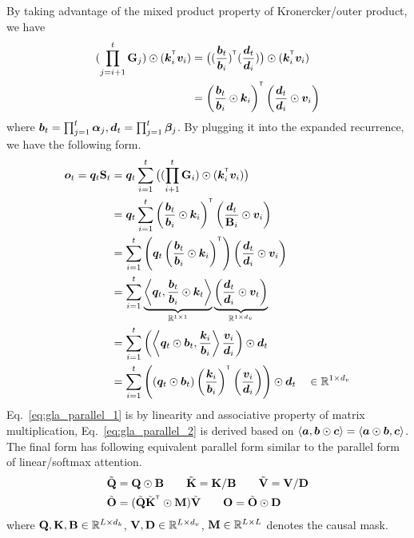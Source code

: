 By taking advantage of the mixed product property of Kronercker/outer product, we have
%
\begin{align}
(\prod_{j=i+1}^{t} \rmG_j) \odot (\vk_i^{\intercal} \vv_i) &= \big((\frac{\vb_t}{\vb_i})^{\intercal}(\frac{\vd_t}{\vd_i})\big) \odot (\vk_i^{\intercal} \vv_i) \\
&=\left( \frac{\vb_t}{\vb_i}\odot \vk_i \right)^{\intercal} \left( \frac{\vd_t}{\vd_i} \odot \vv_i \right) 
\end{align}
%
where ${\bm{b}}_t = \prod_{j=1}^t {\bm{\alpha}}_j, {\bm{d}}_t = \prod_{j=1}^t {\bm{\beta}}_j$.
By plugging it into the expanded recurrence, we have the following form. 
%
\begin{align}
\vo_t = \vq_t \rmS_t 
&= 
\vq_t \sum_{i=1}^{t} \big((\prod_{i+1}^{t} \rmG_{i}) \odot (\vk_i^{\intercal}\vv_i)\big) \\
    &= \vq_t \sum_{i=1}^{t} \left( \frac{\vb_t}{\vb_i}\odot \vk_i \right)^{\intercal} \left( \frac{\vd_t}{\rmB_i} \odot \vv_i \right) \\ 
    &= \sum_{i=1}^{t} \left(\vq_t \left( \frac{\vb_t}{\vb_i}\odot \vk_i \right)^{\intercal}\right) \left( \frac{\vd_t}{\vd_i} \odot \vv_i \right) \label{eq:gla_parallel_1} \\
    &= \sum_{i=1}^{t} \underbrace{\left\langle \vq_t, \frac{\vb_t}{\vb_i} \odot \vk_t \right\rangle}_{\R^{1\times 1}} \underbrace{\left( \frac{\vd_t}{\vd_i} \odot \vv_t \right)}_{\mathbb{R}^{1\times d_v}}  \\    
    &= \sum_{i=1}^{t} \left(\left\langle \vq_t \odot \vb_t, \frac{\vk_i}{\vb_i}\right\rangle \frac{\vv_i}{\vd_i} \right) \odot \vd_t \qquad  \label{eq:gla_parallel_2} \\
    &= \sum_{i=1}^{t} \left( \left(\vq_t \odot \vb_t\right)\left(\frac{\vk_i}{\vb_i}\right)^{\intercal} \left(
    \frac{\vv_i}{\vd_i} \right) \right) \odot \vd_t \quad \in \mathbb{R}^{1\times d_v} 
\end{align}
%
Eq.~\ref{eq:gla_parallel_1} is by linearity and associative property of matrix multiplication, Eq.~\ref{eq:gla_parallel_2} is derived based on $\langle {\bm{a}}, {\bm{b}} \odot {\bm{c}} \rangle = \langle {\bm{a}} \odot {\bm{b}}, {\bm{c}} \rangle$. The final form has following equivalent parallel form similar to the parallel form of linear/softmax attention.
%
\begin{align}
    \tilde \rmQ &= \rmQ \odot \rmB \qquad \tilde \rmK = \rmK / \rmB \qquad \tilde \rmV = \rmV / \rmD \\
    \tilde \rmO &= (\tilde \rmQ \tilde \rmK^\intercal \odot \rmM) \tilde \rmV \qquad \rmO = \tilde \rmO \odot \rmD
    \label{eq:gla_QKV}
\end{align}
%
where ${\mathbf{Q}}, {\mathbf{K}}, {\mathbf{B}} \in \mathbb{R}^{L \times d_k}$,
%
 ${\mathbf{V}}, {\mathbf{D}} \in \mathbb{R}^{L \times d_v}$,
 ${\mathbf{M}} \in \mathbb{R}^{L \times L}$ denotes the causal mask.


